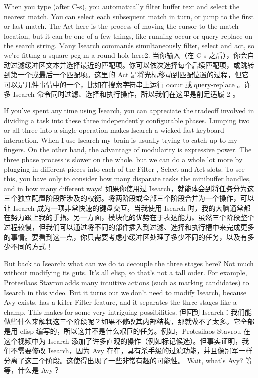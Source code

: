 \documentclass[lang=cn,color=blue]{elegantbook}
\begin{document}
When you type (after C-s), you automatically filter buffer text and select the nearest match. You can select each subsequent match in turn, or jump to the first or last match. The Act here is the process of moving the cursor to the match location, but it can be one of a few things, like running occur or query-replace on the search string. Many Isearch commands simultaneously filter, select and act, so we’re fitting a square peg in a round hole here2.
当你输入（在 C-s 之后），你会自动过滤缓冲区文本并选择最近的匹配项。你可以依次选择每个后续匹配项，或跳转到第一个或最后一个匹配项。这里的 Act 是将光标移动到匹配位置的过程，但它可以是几件事情中的一个，比如在搜索字符串上运行 occur 或 query-replace 。许多 Isearch 命令同时过滤、选择和执行操作，所以我们在这里是削足适履 2 。

If you’ve spent any time using Isearch, you can appreciate the tradeoff involved in dividing a task into these three independently configurable phases. Lumping two or all three into a single operation makes Isearch a wicked fast keyboard interaction. When I use Isearch my brain is usually trying to catch up to my fingers. On the other hand, the advantage of modularity is expressive power. The three phase process is slower on the whole, but we can do a whole lot more by plugging in different pieces into each of the Filter , Select and Act slots. To see this, you have only to consider how many disparate tasks the minibuffer handles, and in how many different ways!
如果你使用过 Isearch，就能体会到将任务分为这三个独立配置阶段所涉及的权衡。将两阶段或全部三个阶段合并为一个操作，可以让 Isearch 成为一项非常快速的键盘交互。当我使用 Isearch 时，我的大脑通常都在努力跟上我的手指。另一方面，模块化的优势在于表达能力。虽然三个阶段整个过程较慢，但我们可以通过将不同的部件插入到过滤、选择和执行槽中来完成更多的事情。要看到这一点，你只需要考虑小缓冲区处理了多少不同的任务，以及有多少不同的方式！

But back to Isearch: what can we do to decouple the three stages here? Not much without modifying its guts. It’s all elisp, so that’s not a tall order. For example, Protesilaos Stavrou adds many intuitive actions (such as marking candidates) to Isearch in this video. But it turns out we don’t need to modify Isearch, because Avy exists, has a killer Filter feature, and it separates the three stages like a champ. This makes for some very intriguing possibilities.
但回到 Isearch：我们能做些什么来解耦这三个阶段呢？如果不修改其内部结构，那就做不了太多。它全部是用 elisp 编写的，所以这并不是什么艰巨的任务。例如，Protesilaos Stavrou 在这个视频中为 Isearch 添加了许多直观的操作（例如标记候选）。但事实证明，我们不需要修改 Isearch，因为 Avy 存在，具有杀手级的过滤功能，并且像冠军一样分离了这三个阶段。这使得出现了一些非常有趣的可能性。
Wait, what’s Avy?  等等，什么是 Avy？
\end{document}
